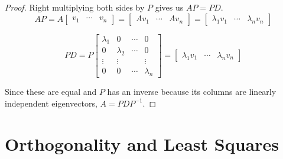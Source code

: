 \documentclass[letterpaper]{article}
\theoremstyle{definition}
\begin{document}
\begin{proof}
Right multiplying both sides by $P$ gives us $AP = PD$. 
$$AP = A \begin{bmatrix}
v_1 & \cdots & v_n
\end{bmatrix} = \begin{bmatrix}
Av_1 & \cdots & Av_n
\end{bmatrix} = \begin{bmatrix}
\lambda_1 v_1 & \cdots & \lambda_n v_n
\end{bmatrix}$$

$$PD = P \begin{bmatrix}
\lambda_1 & 0 & \cdots & 0 \\
0 & \lambda_2 & \cdots & 0 \\
\vdots & \vdots &   & \vdots \\
0 & 0 & \cdots & \lambda_n
\end{bmatrix} = 
\begin{bmatrix}
\lambda_1 v_1 & \cdots & \lambda_n v_n
\end{bmatrix}$$

Since these are equal and $P$ has an inverse because its columns are linearly independent eigenvectors, $A = PDP^{-1}$.
\end{proof}

\section{Orthogonality and Least Squares}
\end{document}
